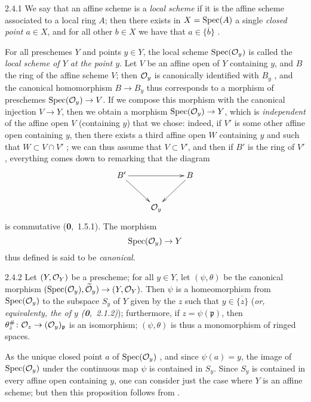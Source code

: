 
\begin{env}{2.4.1}
\label{env-1.2.4.1}
We say that an affine scheme is a \emph{local scheme} if
it is the affine scheme associated to a local ring $A$; then there exists in
$X=\operatorname{Spec}(A)$ a single \emph{closed point $a\in X$}, and for all other $b\in X$
we have that $a\in\overline{\{b\}}$ .
\end{env}
    
For all preschemes $Y$ and points $y\in Y$, the local scheme $\operatorname{Spec}(\mathcal{O}_y)$
is called the \emph{local scheme of $Y$ at the point $y$}. Let $V$ be an affine
open of $Y$ containing $y$, and $B$ the ring of the affine scheme $V$; then
$\mathcal{O}_y$ is canonically identified with $B_y$ , and the canonical
homomorphism $B\to B_y$ thus corresponds  to a morphism of preschemes
$\operatorname{Spec}(\mathcal{O}_y)\to V$.  If we compose this morphism with the canonical injection
$V\to Y$, then we obtain a morphism $\operatorname{Spec}(\mathcal{O}_y)\to Y$, which is
\emph{independent} of the affine open $V$ (containing $y$) that we chose:
indeed, if $V'$ is some other affine open containing $y$, then there exists a
third affine open $W$ containing $y$ and such that $W\subset V\cap V'$ ;
we can thus assume that $V\subset V'$, and then if $B'$ is the ring of $V'$,
everything comes down to remarking that the diagram
\[
  \xymatrix{
    B'\ar[rr]\ar[dr] & & B\ar[dl]\\
    & \O_y &
  }
\]
is commutative
(\textbf{0},~1.5.1). The morphism \[ \operatorname{Spec}(\mathcal{O}_y)\to Y \] thus defined is said
to be \emph{canonical}.
    
\begin{env}[Proposition]{2.4.2}
\label{prop-1.2.4.2}
Let $(Y,\mathcal{O}_Y)$ be a prescheme;
for all $y\in Y$, let $(\psi,\theta)$ be the canonical morphism
$(\operatorname{Spec}(\mathcal{O}_y),\widetilde{\mathcal{O}}_y)\to(Y,\mathcal{O}_Y)$. Then $\psi$ is a homeomorphism
from $\operatorname{Spec}(\mathcal{O}_y)$ to the subspace $S_y$ of $Y$ given by the $z$ such that
$y\in\overline{\{z\}}$ (\emph{or, equivalenty, the \emph{} of $y$
(\textbf{0},~2.1.2)}); furthermore, if $z=\psi(\mathfrak{p})$, then
$\theta_z^\#\colon\mathcal{O}_z\to(\mathcal{O}_y)_\mathfrak{p}$ is an isomorphism; $(\psi,\theta)$
is thus a monomorphism of ringed spaces.
\end{env}
    
As the unique closed point $a$ of $\operatorname{Spec}(\mathcal{O}_y)$ , and since $\psi(a)=y$, the image of $\operatorname{Spec}(\mathcal{O}_y)$ under
the continuous map $\psi$ is contained in $S_y$. Since $S_y$ is contained in
every affine open containing $y$, one can consider just the case where $Y$ is an
affine scheme; but then this proposition follows from .
    
